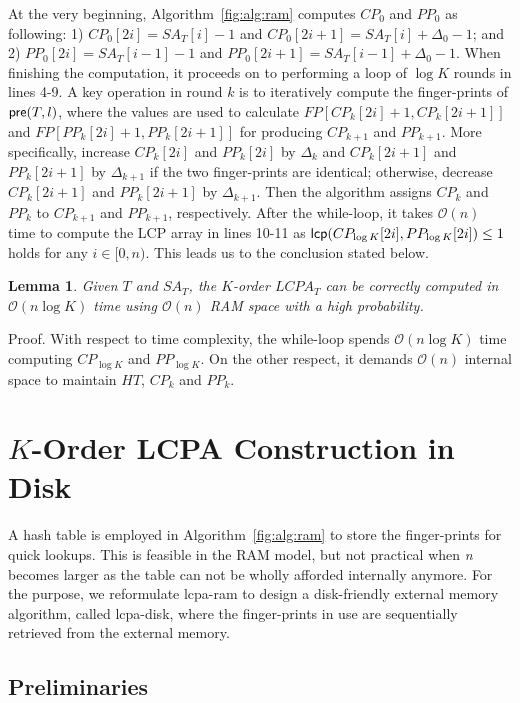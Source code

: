 \documentclass{llncs}
\newtheorem{lem}{Lemma}
\begin{document}
At the very beginning, Algorithm~\ref{fig:alg:ram} computes $CP_0$ and $PP_0$ as following: 1) $CP_0[2i]=SA_T[i]-1$ and $CP_0[2i+1]=SA_T[i]+ \Delta_0 - 1$; and 2) $PP_0[2i]=SA_T[i-1]-1$ and $PP_0[2i+1]=SA_T[i-1]+ \Delta_0 - 1$. When finishing the computation, it proceeds on to performing a loop of $\log K$ rounds in lines 4-9. A key operation in round $k$ is to iteratively compute the finger-prints of ${\sf pre}(T,l)$, where the values are used to calculate $FP[CP_k[2i]+1,CP_k[2i+1]]$ and $FP[PP_k[2i]+1,PP_k[2i+1]]$ for producing $CP_{k+1}$ and $PP_{k+1}$. More specifically, increase $CP_{k}[2i]$ and $PP_{k}[2i]$ by $\Delta_k$ and $CP_{k}[2i+1]$ and $PP_{k}[2i+1]$ by $\Delta_{k+1}$ if the two finger-prints are identical; otherwise, decrease $CP_{k}[2i+1]$ and $PP_{k}[2i+1]$  by $\Delta_{k+1}$. Then the algorithm assigns $CP_k$ and $PP_k$ to $CP_{k+1}$ and $PP_{k+1}$, respectively. After the while-loop, it takes $\mathcal{O}(n)$ time to compute the LCP array in lines 10-11 as ${\sf lcp}(CP_{\log K}[2i],PP_{\log K}[2i]) \le 1$ holds for any $i \in [0,n)$. This leads us to the conclusion stated below.

\begin{lem}
\label{thm:lcp:ram}
Given $T$ and $SA_T$, the $K$-order $LCPA_T$ can be correctly computed in $\mathcal{O}(n\log K)$ time using $\mathcal{O}(n)$ RAM space with a high probability.
\end{lem}
Proof. With respect to time complexity, the while-loop spends $\mathcal{O}(n\log K)$ time computing $CP_{\log K}$ and $PP_{\log K}$. On the other respect, it demands $\mathcal{O}(n)$ internal space to maintain $HT$, $CP_k$ and $PP_k$.

\section{$K$-Order LCPA Construction in Disk}\label{sec:construction_in_em}

A hash table is employed in Algorithm~\ref{fig:alg:ram} to store the finger-prints for quick lookups. This is feasible in the RAM model, but not practical when {\em n} becomes larger as the table can not be wholly afforded internally anymore. For the purpose, we reformulate lcpa-ram to design a disk-friendly external memory algorithm, called lcpa-disk, where the finger-prints in use are sequentially retrieved from the external memory.

\subsection{Preliminaries}
\end{document}

